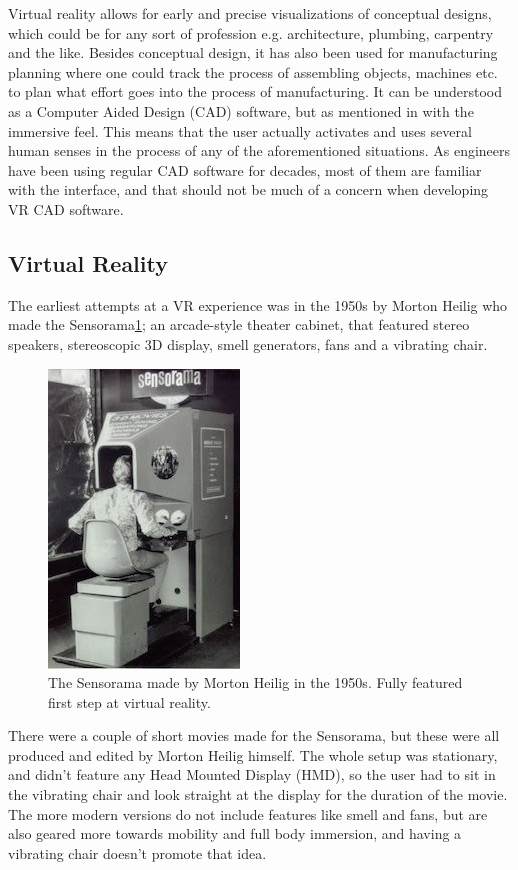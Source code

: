 Virtual reality allows for early and precise visualizations of conceptual designs, which could be for any sort of profession e.g. architecture, plumbing, carpentry and the like. Besides conceptual design, it has also been used for manufacturing planning where one could track the process of assembling objects, machines etc. to plan what effort goes into the process of manufacturing. It can be understood as a Computer Aided Design (CAD) software, but as mentioned in \cite{engineeringVR} with the immersive feel. This means that the user actually activates and uses several human senses in the process of any of the aforementioned situations. As engineers have been using regular CAD software for decades, most of them are familiar with the interface, and that should not be much of a concern when developing VR CAD software.


\subsection{Virtual Reality}
The earliest attempts at a VR experience was in the 1950s\cite{VRS} by Morton Heilig who made the Sensorama\ref{fig:sensorama}; an arcade-style theater cabinet, that featured stereo speakers, stereoscopic 3D display, smell generators, fans and a vibrating chair.
\begin{figure}[H]
	\centering
	\includegraphics[width=0.4\linewidth]{figure/Analysis/sensorama2}
	\caption{The Sensorama made by Morton Heilig in the 1950s. Fully featured first step at virtual reality.}
	\label{fig:sensorama}
\end{figure}
There were a couple of short movies made for the Sensorama, but these were all produced and edited by Morton Heilig himself. The whole setup was stationary, and didn't feature any Head Mounted Display (HMD), so the user had to sit in the vibrating chair and look straight at the display for the duration of the movie. The more modern versions do not include features like smell and fans, but are also geared more towards mobility and full body immersion, and having a vibrating chair doesn't promote that idea.\\

